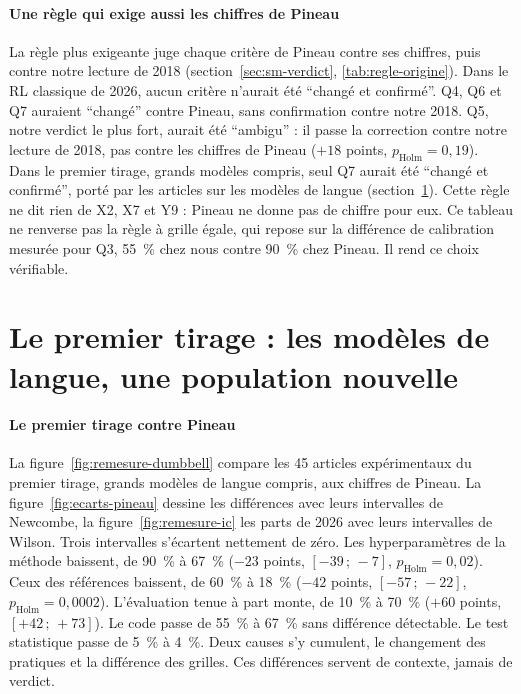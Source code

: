 \paragraph{Une règle qui exige aussi les chiffres de Pineau}
La règle plus exigeante juge chaque critère de Pineau contre ses chiffres, puis contre notre lecture de
2018 (section~\ref{sec:sm-verdict}, \cref{tab:regle-origine}). Dans le RL classique de 2026, aucun
critère n'aurait été \enquote{changé et
confirmé}. Q4, Q6 et Q7 auraient \enquote{changé} contre Pineau, sans confirmation contre notre 2018. Q5, notre
verdict le plus fort, aurait été \enquote{ambigu} : il passe la correction contre notre lecture de 2018, pas contre
les chiffres de Pineau ($+18$ points, $p_{\text{Holm}} = 0{,}19$). Dans le premier tirage, grands modèles compris,
seul Q7 aurait été \enquote{changé et confirmé}, porté par les articles sur les modèles de langue
(section~\ref{sec:sr-premier}). Cette règle ne dit rien de X2, X7 et Y9 : Pineau ne donne pas de chiffre
pour eux. Ce tableau ne renverse pas la règle à grille égale, qui repose sur la différence de calibration mesurée
pour Q3, 55~\% chez nous contre 90~\% chez Pineau. Il rend ce choix vérifiable.


\section{Le premier tirage : les modèles de langue, une population nouvelle}\label{sec:sr-premier}

\paragraph{Le premier tirage contre Pineau}
La figure~\ref{fig:remesure-dumbbell} compare les 45 articles expérimentaux du premier tirage, grands
modèles de langue compris, aux chiffres de Pineau. La figure~\ref{fig:ecarts-pineau} dessine les différences avec
leurs intervalles de Newcombe, la figure~\ref{fig:remesure-ic} les parts de 2026 avec leurs intervalles de
Wilson. Trois intervalles s'écartent nettement de zéro. Les hyperparamètres de la méthode baissent, de
90~\% à 67~\% ($-23$ points, $[-39\,;\,-7]$, $p_{\text{Holm}} = 0{,}02$). Ceux des références baissent,
de 60~\% à 18~\% ($-42$ points, $[-57\,;\,-22]$, $p_{\text{Holm}} = 0{,}0002$). L'évaluation tenue à
part monte, de 10~\% à 70~\% ($+60$ points, $[+42\,;\,+73]$). Le code passe de 55~\% à 67~\% sans différence
détectable. Le test statistique passe de 5~\% à 4~\%. Deux causes s'y cumulent, le changement des
pratiques et la différence des grilles. Ces différences servent de contexte, jamais de verdict.

